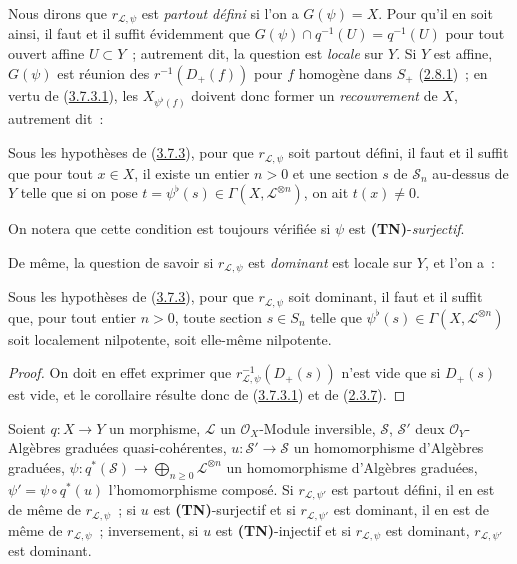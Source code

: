 Nous dirons que $r_{\mathcal{L},\psi}$ est \emph{partout défini} si l'on a
$G(\psi)=X$. Pour qu'il en soit ainsi, il faut et il suffit évidemment que
$G(\psi)\cap q^{-1}(U)=q^{-1}(U)$ pour tout ouvert affine $U\subset Y$~;
autrement dit, la question est \emph{locale} sur $Y$. Si $Y$ est affine,
$G(\psi)$ est réunion des $r^{-1}(D_+(f))$ pour $f$ homogène dans $S_+$
(\hyperref[II.2.8.1-fr]{2.8.1})~; en vertu de
(\hyperref[II.3.7.3.1-fr]{3.7.3.1}), les $X_{\psi^\flat(f)}$ doivent donc
former un \emph{recouvrement} de $X$, autrement dit~:

\begin{corollary}[3.7.4]
\label{II.3.7.4-fr}
Sous les hypothèses de \textup{(\hyperref[II.3.7.3-fr]{3.7.3})}, pour que
$r_{\mathcal{L},\psi}$ soit partout défini, il faut et il suffit que pour tout
$x\in X$, il existe un entier $n>0$ et une section $s$ de $\mathcal{S}_n$
au-dessus de $Y$ telle que si on pose
$t=\psi^\flat(s)\in\Gamma(X,\mathcal{L}^{\otimes n})$, on ait $t(x)\neq0$.
\end{corollary}


On notera que cette condition est toujours vérifiée si $\psi$ est
\textbf{(TN)}-\emph{surjectif}.

De même, la question de savoir si $r_{\mathcal{L},\psi}$ est \emph{dominant}
est locale sur $Y$, et l'on a~:

\begin{corollary}[3.7.5]
\label{II.3.7.5-fr}
Sous les hypothèses de \textup{(\hyperref[II.3.7.3-fr]{3.7.3})}, pour que
$r_{\mathcal{L},\psi}$ soit dominant, il faut et il suffit que, pour tout
entier $n>0$, toute section $s\in S_n$ telle que
$\psi^\flat(s)\in\Gamma(X,\mathcal{L}^{\otimes n})$ soit localement
nilpotente, soit elle-même nilpotente.
\end{corollary}

\begin{proof}
On doit en effet exprimer que
$r_{\mathcal{L},\psi}^{-1}(D_+(s))$ n'est vide que si $D_+(s)$ est vide,
et le corollaire résulte donc de
(\hyperref[II.3.7.3.1-fr]{3.7.3.1}) et de
(\hyperref[II.2.3.7-fr]{2.3.7}).
\end{proof}

\begin{proposition}[3.7.6]
\label{II.3.7.6-fr}
Soient $q:X\to Y$ un morphisme, $\mathcal{L}$ un $\mathcal{O}_X$-Module
inversible, $\mathcal{S}$, $\mathcal{S}'$ deux $\mathcal{O}_Y$-Algèbres
graduées quasi-cohérentes,
$u:\mathcal{S}'\to\mathcal{S}$ un homomorphisme d'Algèbres graduées,
$\psi:q^*(\mathcal{S})\to\bigoplus_{n\geq0}\mathcal{L}^{\otimes n}$ un
homomorphisme d'Algèbres graduées,
$\psi'=\psi\circ q^*(u)$ l'homomorphisme composé. Si
$r_{\mathcal{L},\psi'}$ est partout défini, il en est de même de
$r_{\mathcal{L},\psi}$~; si $u$ est \textup{\textbf{(TN)}}-surjectif et si
$r_{\mathcal{L},\psi'}$ est dominant, il en est de même de
$r_{\mathcal{L},\psi}$~; inversement, si $u$ est \textup{\textbf{(TN)}}-injectif et si
$r_{\mathcal{L},\psi}$ est dominant, $r_{\mathcal{L},\psi'}$ est dominant.
\end{proposition}

